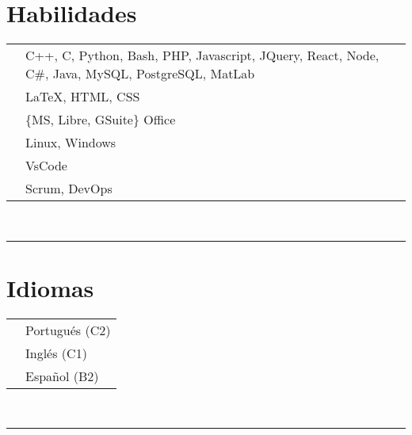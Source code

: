 \documentclass[oneside]{article}
\begin{document}
{\begin{minipage}[t][\textheight-2\fboxsep-2\fboxrule][t]{\dimexpr0.40\textwidth-2\fboxrule-2\fboxsep\relax}
        \section*{\large Habilidades}
        \begin{tabularx}{\textwidth}{cY}
            \faCode{}        & C++, C, Python, Bash, PHP, Javascript, JQuery, React, Node, C\#, Java, MySQL, PostgreSQL, MatLab \\
            \faPen*{}        & \LaTeX, HTML, CSS \\
            \faFont{}        & \{MS, Libre, GSuite\} Office \\
            \faCogs{}        & Linux, Windows \\
            \faLaptopCode{}  & VsCode \\
            \faToolbox{}     & Scrum, DevOps
        \end{tabularx}
        \vspace{1pt} \\
        \rule{\linewidth}{0.4pt}
        \section*{\large Idiomas}
        \begin{tabular}{cl}
            \faLanguage{} & Portugués (C2) \\
            \faLanguage{} & Inglés (C1) \\
            \faLanguage{} & Español (B2) 
        \end{tabular}
        \vspace{.3cm}
        \\
        \rule{\linewidth}{0.4pt}
        \\

    \end{minipage}
}
\hfill
\end{document}
